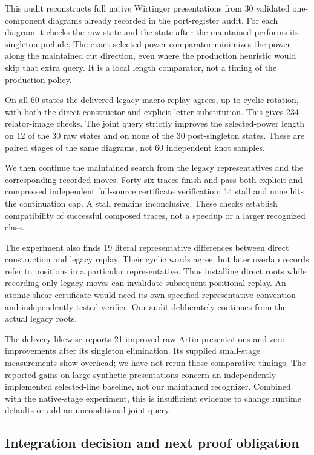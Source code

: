 This audit reconstructs full native Wirtinger presentations from 30 validated
one-component diagrams already recorded in the port-register audit. For
each diagram it checks the raw state and the state after the maintained
 performs its singleton prelude. The exact selected-power
comparator minimizes the power along the maintained cut direction, even
where the production heuristic would skip that extra query. It is a local
length comparator, not a timing of the production policy.

On all 60 states the delivered legacy macro replay agrees, up to cyclic
rotation, with both the direct constructor and explicit letter substitution.
This gives 234 relator-image checks. The joint query strictly improves the
selected-power length on 12 of the 30 raw states and on none of the 30
post-singleton states. These are paired stages of the same diagrams, not
60 independent knot samples.

We then continue the maintained search from the legacy representatives and
the corresponding recorded moves. Forty-six traces finish and pass both
explicit and compressed independent full-source certificate verification;
14 stall and none hits the continuation cap. A stall remains inconclusive.
These checks establish compatibility of successful composed traces, not a
speedup or a larger recognized class.

The experiment also finds 19 literal representative differences between
direct construction and legacy replay. Their cyclic words agree, but later
overlap records refer to positions in a particular representative. Thus
installing direct roots while recording only legacy moves can invalidate
subsequent positional replay. An atomic-shear certificate would need its
own specified representative convention and independently tested verifier.
Our audit deliberately continues from the actual legacy roots.

The delivery likewise reports 21 improved raw Artin presentations and zero
improvements after its singleton elimination. Its supplied small-stage
measurements show overhead; we have not rerun those comparative timings.
The reported gains on large synthetic presentations concern an independently
implemented selected-line baseline, not our maintained recognizer. Combined
with the native-stage experiment, this is insufficient evidence to change
runtime defaults or add an unconditional joint query.

\subsection{Integration decision and next proof obligation}

